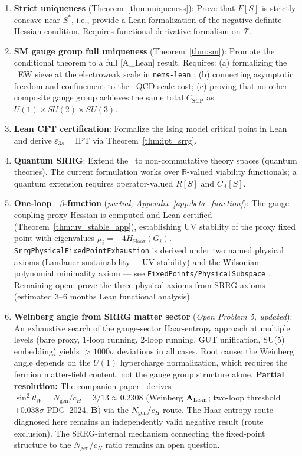 \documentclass[11pt]{article}
\theoremstyle{remark}
\newcommand{\SRRG}{\text{SRRG}}
\newcommand{\CatAL}{\ensuremath{\textbf{A}_{\rm Lean}}}
\newcommand{\CatB}{\textbf{B}}
\newcommand{\IPT}{\mathrm{IPT}}
\newcommand{\PSC}{\text{PSC}}
\newcommand{\lean}[1]{%
  \penalty-100
  \begingroup
  \def\_{\textunderscore\allowbreak}%
  \texttt{#1}%
  \endgroup
}
\newcommand{\Sstar}{S^*}
\begin{document}
\begin{enumerate}[leftmargin=2.5em]
\item \textbf{Strict uniqueness} (Theorem~\ref{thm:uniqueness}): Prove that $F[S]$
  is strictly concave near $\Sstar$, i.e., provide a Lean formalization of the
  negative-definite Hessian condition. Requires functional derivative formalism
  on $\mathcal{T}$.

\item \textbf{SM gauge group full uniqueness} (Theorem~\ref{thm:sm}):
  Promote the conditional theorem to a full [A\_Lean] result.  Requires:
  (a) formalizing the \PSC\ EW sieve at the electroweak scale in \lean{nems-lean};
  (b) connecting asymptotic freedom and confinement to the \SRRG\ QCD-scale cost;
  (c) proving that no other composite gauge group achieves the same total
  $C_{\mathrm{SCP}}$ as $U(1) \times SU(2) \times SU(3)$.

\item \textbf{Lean CFT certification}: Formalize the Ising model critical point
  in Lean and derive $\varepsilon_{3s} = \IPT$ via Theorem~\ref{thm:ipt_srrg}.

\item \textbf{Quantum SRRG}: Extend the \SRRG\ to non-commutative theory spaces
  (quantum theories). The current formulation works over $\mathbb{R}$-valued
  viability functionals; a quantum extension requires operator-valued $R[S]$ and
  $C_\Lambda[S]$.

\item \textbf{One-loop \SRRG\ $\beta$-function} (\emph{partial,
  Appendix~\ref{app:beta_function}}):
  The gauge-coupling proxy Hessian is computed and Lean-certified
  (Theorem~\ref{thm:uv_stable_app}), establishing UV stability of the proxy fixed point
  with eigenvalues $\mu_i = -4H_{\mathrm{Haar}}(G_i)$.
  \lean{SrrgPhysicalFixedPointExhaustion} is derived under two named physical axioms
  (Landauer sustainability + UV stability) and the Wilsonian polynomial minimality
  axiom --- see \lean{FixedPoints/PhysicalSubspace}.
  Remaining open: prove the three physical axioms from SRRG axioms
  (estimated 3--6 months Lean functional analysis).

\item \textbf{Weinberg angle from SRRG matter sector} (\emph{Open Problem 5, updated}):
  An exhaustive search of the gauge-sector Haar-entropy approach at multiple
  levels (bare proxy, 1-loop running, 2-loop running, GUT unification, SU(5) embedding)
  yields $>1000\sigma$ deviations in all cases.  Root cause: the Weinberg angle depends on the
  $U(1)$ hypercharge normalization, which requires the fermion matter-field content,
  not the gauge group structure alone.
  \textbf{Partial resolution:} The companion paper~\cite{SpivackWeinberg} derives $\sin^2\theta_W = N_{\mathrm{gen}}/c_H = 3/13 \approx 0.2308$ (Weinberg \CatAL; two-loop threshold $+0.038\sigma$ PDG~2024, \CatB) via the $N_{\mathrm{gen}}/c_H$ route. The Haar-entropy route diagnosed here remains an independently valid negative result (route exclusion). The SRRG-internal mechanism connecting the fixed-point structure to the $N_{\mathrm{gen}}/c_H$ ratio remains an open question.


\end{enumerate}
\end{document}
